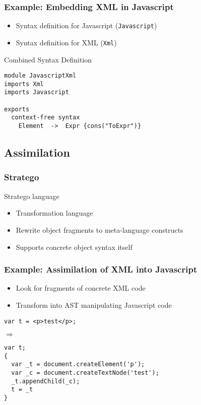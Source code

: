 \documentclass{beamer}
\begin{document}
\begin{frame}[fragile]

  \frametitle{Example: Embedding XML in Javascript}

  \begin{itemize}
    \item Syntax definition for Javascript (\texttt{Javascript})
    \item Syntax definition for XML (\texttt{Xml})
  \end{itemize}

  \begin{block}{Combined Syntax Definition}
    \begin{lstlisting}[language=SDF]
module JavascriptXml
imports Xml
imports Javascript

exports
  context-free syntax
    Element  ->  Expr {cons("ToExpr")}
    \end{lstlisting}
  \end{block}

\end{frame}


\subsection{Assimilation}

\begin{frame}

  \frametitle{Stratego}

  \begin{block}{Stratego language}
    \begin{itemize}
      \item Transformation language
      \item Rewrite object fragments to meta-language constructs
      \item Supports concrete object syntax itself
    \end{itemize}
  \end{block}

\end{frame}


\begin{frame}[fragile]

  \frametitle{Example: Assimilation of XML into Javascript}

  \begin{itemize}
    \item Look for fragments of concrete XML code
    \item Transform into AST manipulating Javascript code
  \end{itemize}

  \begin{lstlisting}
var t = <p>test</p>;
  \end{lstlisting}

$\Rightarrow$

  \begin{lstlisting}
var t;
{
  var _t = document.createElement('p');
  var _c = document.createTextNode('test');
  _t.appendChild(_c);
  t = _t
}
  \end{lstlisting}

\end{frame}
\end{document}
